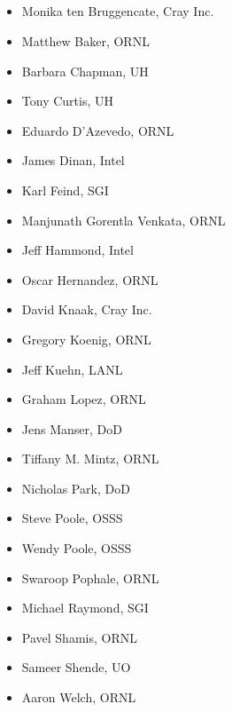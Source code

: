 \subsection*{}
\begin{multicols}{2}
\begin{itemize}
\setlength\itemsep{0.1em}
\item Monika ten Bruggencate, Cray Inc.
\item Matthew Baker, \ac{ORNL}
\item Barbara Chapman, \ac{UH}
\item Tony Curtis, \ac{UH}
\item Eduardo D’Azevedo, \ac{ORNL}
\item James Dinan, Intel
\item Karl Feind, \ac{SGI}
\item Manjunath Gorentla Venkata, \ac{ORNL}
\item Jeff Hammond, Intel
\item Oscar Hernandez, \ac{ORNL}
\item David Knaak, Cray Inc.
\item Gregory Koenig, \ac{ORNL}
\item Jeff Kuehn, \ac{LANL}
\item Graham Lopez, \ac{ORNL}
\item Jens Manser, \ac{DoD}
\item Tiffany M. Mintz, \ac{ORNL}
\item Nicholas Park, \ac{DoD}
\item Steve Poole, \ac{OSSS}
\item Wendy Poole, \ac{OSSS}
\item Swaroop Pophale, \ac{ORNL}
\item Michael Raymond, \ac{SGI}
\item Pavel Shamis, \ac{ORNL}
\item Sameer Shende, \ac{UO}
\item Aaron Welch, \ac{ORNL}
\end{itemize}
\end{multicols}

